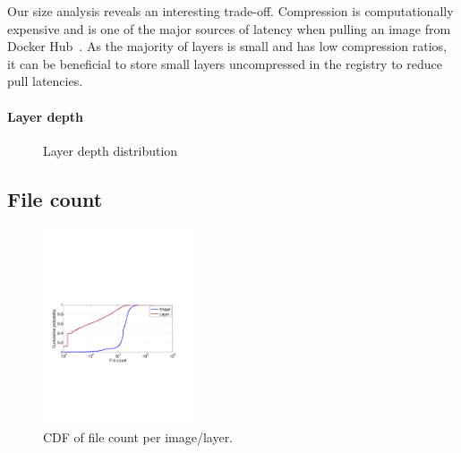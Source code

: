 Our size analysis reveals an interesting trade-off. Compression is computationally
expensive and is one of the major sources of latency when pulling an image from Docker Hub~\cite{slacker}.
As the majority of layers is small and has low compression ratios, it can
be beneficial to store small layers uncompressed in the registry to reduce pull latencies.

\paragraph{Layer depth}

\begin{figure}[!t]
	\centering
	\caption{Layer depth distribution}
	\label{fig:reference-cnt}
\end{figure}

\subsection{File count} 
\begin{figure}
	\centering
	\includegraphics[width=0.4\textwidth]{graphs/file-cnt-cdf.pdf}
	\caption{CDF of file count per image/layer.
	}
	\label{fig:reference-cnt}
\end{figure}

